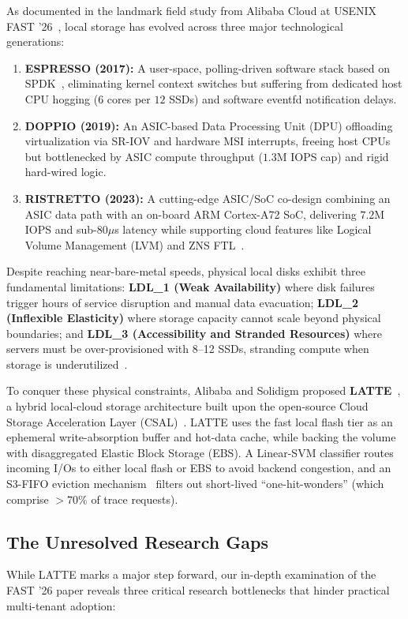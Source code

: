 \documentclass[10pt,twocolumn]{article}
\begin{document}
As documented in the landmark field study from Alibaba Cloud at USENIX FAST '26~\cite{yang2026here}, local storage has evolved across three major technological generations:
\begin{enumerate}
    \item \textbf{ESPRESSO (2017):} A user-space, polling-driven software stack based on SPDK~\cite{spdk2025}, eliminating kernel context switches but suffering from dedicated host CPU hogging ($6$ cores per $12$ SSDs) and software eventfd notification delays.
    \item \textbf{DOPPIO (2019):} An ASIC-based Data Processing Unit (DPU) offloading virtualization via SR-IOV and hardware MSI interrupts, freeing host CPUs but bottlenecked by ASIC compute throughput ($1.3$M IOPS cap) and rigid hard-wired logic.
    \item \textbf{RISTRETTO (2023):} A cutting-edge ASIC/SoC co-design combining an ASIC data path with an on-board ARM Cortex-A72 SoC, delivering $7.2$M IOPS and sub-$80\mu$s latency while supporting cloud features like Logical Volume Management (LVM) and ZNS FTL~\cite{bjorling2021zns}.
\end{enumerate}

Despite reaching near-bare-metal speeds, physical local disks exhibit three fundamental limitations: \textbf{LDL\_1 (Weak Availability)} where disk failures trigger hours of service disruption and manual data evacuation; \textbf{LDL\_2 (Inflexible Elasticity)} where storage capacity cannot scale beyond physical boundaries; and \textbf{LDL\_3 (Accessibility and Stranded Resources)} where servers must be over-provisioned with 8--12 SSDs, stranding compute when storage is underutilized~\cite{yang2026here, zhang2024ebs}.

To conquer these physical constraints, Alibaba and Solidigm proposed \textbf{LATTE}~\cite{yang2026here}, a hybrid local-cloud storage architecture built upon the open-source Cloud Storage Acceleration Layer (CSAL)~\cite{zhou2024csal}. LATTE uses the fast local flash tier as an ephemeral write-absorption buffer and hot-data cache, while backing the volume with disaggregated Elastic Block Storage (EBS). A Linear-SVM classifier routes incoming I/Os to either local flash or EBS to avoid backend congestion, and an S3-FIFO eviction mechanism~\cite{yang2023fifo} filters out short-lived ``one-hit-wonders'' (which comprise $>70\%$ of trace requests).

\subsection{The Unresolved Research Gaps}
While LATTE marks a major step forward, our in-depth examination of the FAST '26 paper reveals three critical research bottlenecks that hinder practical multi-tenant adoption:
\end{document}
